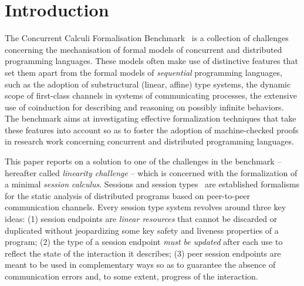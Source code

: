 \section{Introduction}
\label{sec:introduction}

The Concurrent Calculi Formalisation Benchmark~\citep{CarboneEtAl24} is a
collection of challenges concerning the mechanisation of formal models of
concurrent and distributed programming languages.
%
These models often make use of distinctive features that set them apart from the
formal models of \emph{sequential} programming languages, such as the adoption
of substructural (linear, affine) type systems, the dynamic scope of first-class
channels in systems of communicating processes, the extensive use of coinduction
for describing and reasoning on possibly infinite behaviors.
%
The benchmark aims at investigating effective formalization techniques that take
these features into account so as to foster the adoption of machine-checked
proofs in research work concerning concurrent and distributed programming
languages.

This paper reports on a solution to one of the challenges in the benchmark --
hereafter called \emph{linearity challenge} -- which is concerned with the
formalization of a minimal \emph{session calculus}. Sessions and session
types~\citep{Honda93,HondaVasconcelosKubo98,HuttelEtAl16} are established
formalisms for the static analysis of distributed programs based on peer-to-peer
communication channels. Every session type system revolves around three key
ideas: (1) session endpoints are \emph{linear resources} that cannot be
discarded or duplicated without jeopardizing some key safety and liveness
properties of a program; (2) the type of a session endpoint \emph{must be
updated} after each use to reflect the state of the interaction it describes;
(3) peer session endpoints are meant to be used in complementary ways so as to
guarantee the absence of communication errors and, to some extent, progress of
the interaction.

